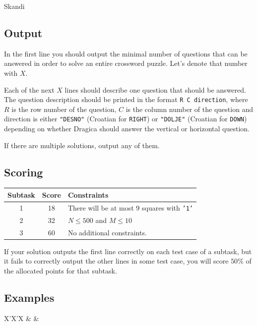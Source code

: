 \begin{statement}[
  problempoints=110,
  timelimit=10 seconds,
  memorylimit=512 MiB,
]{Skandi}
\subsection*{Output}
In the first line you should output the minimal number of questions that
can be answered in order to solve an entire crossword puzzle. Let's denote
that number with $X$.

Each of the next $X$ lines should describe one question that should be
answered.  The question description should be printed in the format \texttt{R
C direction}, where $R$ is the row number of the question, $C$ is the column
number of the question and direction is either \texttt{"DESNO"} (Croatian for
\texttt{RIGHT}) or \texttt{"DOLJE"} (Croatian for \texttt{DOWN}) depending on
whether Dragica should answer the vertical or horizontal question.

If there are multiple solutions, output any of them.

\subsection*{Scoring}
{\renewcommand{\arraystretch}{1.4}
  \setlength{\tabcolsep}{6pt}
  \begin{tabular}{ccl}
 Subtask & Score & Constraints \\ \midrule
  1 & 18 & There will be at most $9$ squares with \texttt{'1'} \\
  2 & 32 & $N \le 500$ and $M \le 10$\\
  3 & 60 & No additional constraints. \\
\end{tabular}}

If your solution outputs the first line correctly on each test case of a
subtask, but it fails to correctly output the other lines in some test case,
you will score $50$\% of the allocated points for that subtask.

\subsection*{Examples}
\begin{tabularx}{\textwidth}{X'X'X}
 &
 &
\end{tabularx}


\end{statement}
